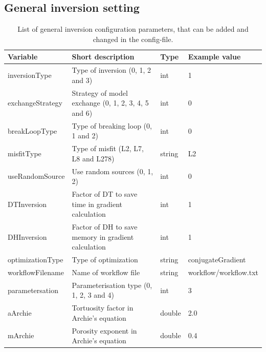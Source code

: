 \documentclass[pdftex,a4paper,parskip,listof=totoc,bibliography=totoc,onehalfspacing,12pt]{scrreprt}
\begin{document}
\subsection{General inversion setting}
\begin{table}[h!]
\caption[List of general inversion configuration parameters.]{List of general inversion configuration parameters, that can be added and changed in the config-file.}\label{tab:config_general_inversion_setting}
\centering
\begin{adjustbox}{width=1\textwidth,center=\textwidth}
	\begin{tabular}{llll}
	\toprule
         Variable                 & Short description                                                   & Type   & Example value \\
	\midrule                 
         inversionType               & Type of inversion (0, 1, 2 and 3)                                                    & int & 1  \\
         exchangeStrategy               & Strategy of model exchange (0, 1, 2, 3, 4, 5 and 6)                                                    & int & 0  \\
         breakLoopType               & Type of breaking loop (0, 1 and 2)                                                    & int & 0  \\
         misfitType               & Type of misfit (L2, L7, L8 and L278)                                                    & string & L2  \\
         useRandomSource & Use random sources (0, 1, 2) & int & \num{0} \\
         DTInversion              & Factor of DT to save time in gradient calculation   &  int   & 1 \\
         DHInversion              & Factor of DH to save memory in gradient calculation   &  int   & 1 \\
         optimizationType         & Type of optimization                                     & string & conjugateGradient \\
         workflowFilename         & Name of workflow file                                               & string & workflow/workflow.txt \\
         parametersation            & Parameterisation type (0, 1, 2, 3 and 4) &  int   & 3  \\
         aArchie            & Tortuosity factor in Archie's equation &  double   & 2.0  \\
         mArchie            & Porosity exponent in Archie's equation &  double   & 0.4  \\

\end{tabular}
\end{adjustbox}
\end{table}
\end{document}
